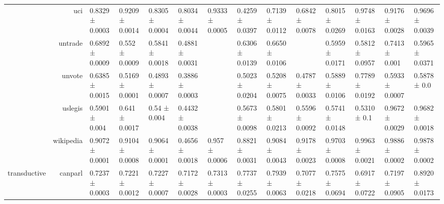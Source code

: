 {\begin{tabular}{@{}crllllllllllll@{}}
                                    & uci                  & 0.8329 ± 0.0003           & 0.9209 ± 0.0014            & 0.8305 ± 0.0004           & 0.8034 ± 0.0044            & \multicolumn{1}{l|}{0.9333 ± 0.0005} & 0.4259 ± 0.0397           & 0.7139 ± 0.0112           & 0.6842 ± 0.0078          & 0.8015 ± 0.0269         & 0.9748 ± 0.0163         & 0.9176 ± 0.0028          & 0.9696 ± 0.0039            \\
                                    & untrade              & 0.6892 ± 0.0009           & 0.552 ± 0.0009             & 0.5841 ± 0.0018           & 0.4881 ± 0.0031            & \multicolumn{1}{l|}{}                & 0.6306 ± 0.0139           & 0.6650 ± 0.0106           &                          & 0.5959 ± 0.0171         & 0.5812 ± 0.0957         & 0.7413 ± 0.001           & 0.5965 ± 0.0371            \\
                                    & unvote               & 0.6385 ± 0.0015           & 0.5169 ± 0.0001            & 0.4893 ± 0.0007           & 0.3886 ± 0.0003            & \multicolumn{1}{l|}{}                & 0.5023 ± 0.0204           & 0.5208 ± 0.0075           & 0.4787 ± 0.0033          & 0.5889 ± 0.0106         & 0.7789 ± 0.0192         & 0.5933 ± 0.0007          & 0.5878 ± 0.0               \\
                                    & uslegis              & 0.5901 ± 0.004            & 0.641 ± 0.0017             & 0.54 ± 0.004              & 0.4432 ± 0.0038            & \multicolumn{1}{l|}{}                & 0.5673 ± 0.0098           & 0.5801 ± 0.0213           & 0.5596 ± 0.0092          & 0.5741 ± 0.0148         & 0.5310 ± 0.1            & 0.9672 ± 0.0029          & 0.9682 ± 0.0018            \\
                                    & wikipedia            & 0.9072 ± 0.0001           & 0.9104 ± 0.0008            & 0.9064 ± 0.0001           & 0.4656 ± 0.0018            & \multicolumn{1}{l|}{0.957 ± 0.0006}  & 0.8821 ± 0.0031           & 0.9084 ± 0.0043           & 0.9178 ± 0.0023          & 0.9703 ± 0.0008         & 0.9963 ± 0.0021         & 0.9886 ± 0.0002          & 0.9878 ± 0.0002            \\
\multirow{15}{*}{transductive}      & canparl              & 0.7237 ± 0.0003           & 0.7221 ± 0.0012            & 0.7227 ± 0.0007           & 0.7172 ± 0.0028            & \multicolumn{1}{l|}{0.7313 ± 0.0003} & 0.7737 ± 0.0255           & 0.7939 ± 0.0063           & 0.7077 ± 0.0218          & 0.7575 ± 0.0694         & 0.6917 ± 0.0722         & 0.7197 ± 0.0905          & 0.8920 ± 0.0173            \\

\end{tabular}}
